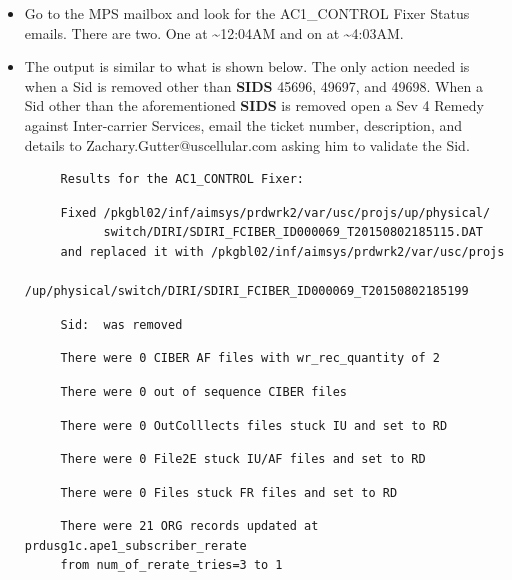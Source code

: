 \documentclass[12pt,twoside]{article}
\begin{document}
\begin{itemize}
\item Go to the MPS mailbox and look for the AC1\_CONTROL Fixer Status emails.  There are two.  One at \~{}12:04AM and on at \~{}4:03AM.
\item The output is similar to what is shown below.  The only action needed is when a Sid is removed other than \textbf{SIDS} 45696, 49697, and 49698.  When a Sid other than the aforementioned \textbf{SIDS} is removed open a Sev 4 Remedy against Inter-carrier Services, email the ticket number, description, and details to Zachary.Gutter@uscellular.com asking him to validate the Sid.
 
\begin{verbatim}
     Results for the AC1_CONTROL Fixer:
\end{verbatim}
 
\begin{verbatim}
     Fixed /pkgbl02/inf/aimsys/prdwrk2/var/usc/projs/up/physical/
           switch/DIRI/SDIRI_FCIBER_ID000069_T20150802185115.DAT 
     and replaced it with /pkgbl02/inf/aimsys/prdwrk2/var/usc/projs
           /up/physical/switch/DIRI/SDIRI_FCIBER_ID000069_T20150802185199
\end{verbatim}

\begin{verbatim}
     Sid:  was removed
\end{verbatim}
 
\begin{verbatim}
     There were 0 CIBER AF files with wr_rec_quantity of 2
\end{verbatim}
 
\begin{verbatim}
     There were 0 out of sequence CIBER files
\end{verbatim}
 
\begin{verbatim}
     There were 0 OutColllects files stuck IU and set to RD
\end{verbatim}
 
\begin{verbatim}
     There were 0 File2E stuck IU/AF files and set to RD
\end{verbatim}
 
\begin{verbatim}
     There were 0 Files stuck FR files and set to RD
\end{verbatim}
 
\begin{verbatim}
     There were 21 ORG records updated at prdusg1c.ape1_subscriber_rerate
     from num_of_rerate_tries=3 to 1
\end{verbatim}
 

\end{itemize}
\end{document}
